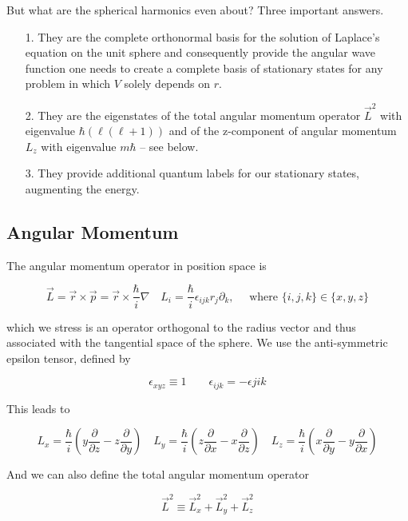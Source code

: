 But what are the spherical harmonics even about? Three important answers. 

\begin{itemize}
  \item[1.] They are the complete orthonormal basis for the solution of
    Laplace's equation on the unit sphere and consequently provide the angular
    wave function one needs to create a complete basis of stationary states for
    any problem in which $V$ solely depends on $r$. 
  \item[2.] They are the eigenstates of the total angular momentum operator
    $\vec{L}^2$ with eigenvalue $\hbar(\ell (\ell +1))$ and of the z-component
    of angular momentum $L_z$ with eigenvalue $m\hbar$ -- see below. 
  \item[3.] They provide additional quantum labels for our stationary states,
    augmenting the energy. 
\end{itemize}

\subsection{Angular Momentum}

The angular momentum operator in position space is 

\[
  \vec{L} = \vec{r} \times \vec{p} = \vec{r} \times \frac{\hbar}{i} \nabla
  \quad L_i = \frac{\hbar}{i} \epsilon_{ijk} r_j \partial_k, \quad \text{ where
  } \{i,j,k\} \in \{x, y, z \} 
\] \vspace{3px}

which we stress is an operator orthogonal to the radius vector and thus
associated with the tangential space of the sphere. We use the anti-symmetric
epsilon tensor, defined by 

\[
  \epsilon_{xyz} \equiv 1 \qquad \epsilon_{ijk} = -\epsilon{jik}
\] \vspace{3px}

This leads to 

\[
L_x = \frac{\hbar}{i} \left( y \frac{\partial }{\partial z} - z \frac{\partial
}{\partial y}  \right) \quad L_y = \frac{\hbar}{i} \left( z \frac{\partial
}{\partial x} - x \frac{\partial }{\partial z}  \right) \quad L_z
= \frac{\hbar}{i} \left( x \frac{\partial }{\partial y} - y \frac{\partial
}{\partial x}  \right)   
\] \vspace{3px}

And we can also define the total angular momentum operator 

\[
\vec{L}^2 \equiv \vec{L}_x^2 + \vec{L}_y^2 + \vec{L}_z^2
\] \vspace{3px}

